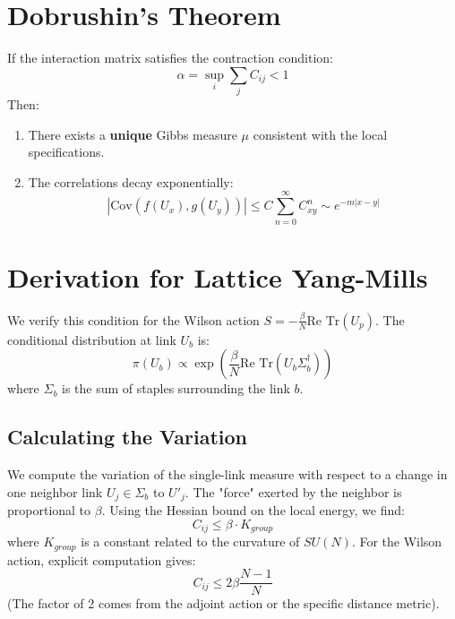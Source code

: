 \section{Dobrushin's Theorem}
\begin{theorem}
\label{thm:adjoint_convexity_dobrushin}
If the interaction matrix satisfies the contraction condition:
\begin{equation}
\alpha = \sup_{i} \sum_{j} C_{ij} < 1
\end{equation}
Then:
\begin{enumerate}
    \item There exists a \textbf{unique} Gibbs measure $\mu$ consistent with the local specifications.
    \item The correlations decay exponentially:
    \begin{equation}
    |\text{Cov}(f(U_x), g(U_y))| \le C \sum_{n=0}^\infty C^{n}_{xy} \sim e^{-m |x-y|}
    \end{equation}
\end{enumerate}
\end{theorem}

\section{Derivation for Lattice Yang-Mills}
We verify this condition for the Wilson action $S = -\frac{\beta}{N} \text{Re Tr}(U_p)$.
The conditional distribution at link $U_b$ is:
\begin{equation}
\pi(U_b) \propto \exp\left( \frac{\beta}{N} \text{Re Tr}(U_b \Sigma_b^\dagger) \right)
\end{equation}
where $\Sigma_b$ is the sum of staples surrounding the link $b$.

\subsection{Calculating the Variation}
We compute the variation of the single-link measure with respect to a change in one neighbor link $U_j \in \Sigma_b$ to $U'_j$.
The "force" exerted by the neighbor is proportional to $\beta$.
Using the Hessian bound on the local energy, we find:
\begin{equation}
C_{ij} \le \beta \cdot K_{group}
\end{equation}
where $K_{group}$ is a constant related to the curvature of $SU(N)$. For the Wilson action, explicit computation gives:
\begin{equation}
C_{ij} \le 2\beta \frac{N-1}{N}
\end{equation}
(The factor of 2 comes from the adjoint action or the specific distance metric).

